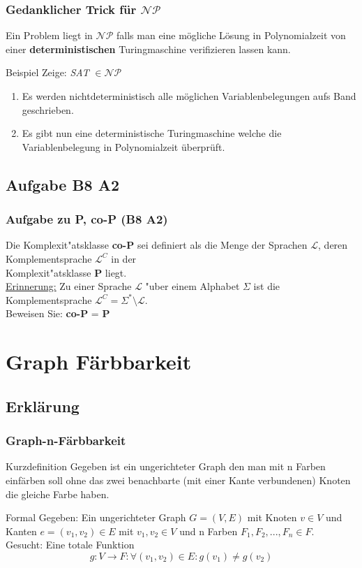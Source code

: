 \begin{frame}
	\frametitle{Gedanklicher Trick für $\mathcal{NP}$}
	Ein Problem liegt in $\mathcal{NP}$ falls man eine mögliche Lösung in Polynomialzeit von einer \textbf{deterministischen} Turingmaschine verifizieren lassen kann.
	\begin{block}{Beispiel}
		Zeige: \emph{SAT} $\in \mathcal{NP}$
		\begin{enumerate}
			\item Es werden nichtdeterministisch alle möglichen Variablenbelegungen aufs Band geschrieben.
			\item Es gibt nun eine deterministische Turingmaschine welche die Variablenbelegung in Polynomialzeit überprüft.
		\end{enumerate}
	\end{block}
\end{frame}
\subsection{Aufgabe B8 A2}
\begin{frame}
	\frametitle{Aufgabe zu P, co-P (B8 A2)}
	Die Komplexit"atsklasse \textbf{co-P} sei definiert als die Menge der Sprachen
	$\mathcal{L}$, deren Komplementsprache $\mathcal{L}^C$ in der\\
	Komplexit"atsklasse \textbf{P} liegt.\\
	\underline{Erinnerung:} Zu einer Sprache $\mathcal{L}$ "uber einem Alphabet $\Sigma$
	ist die Komplementsprache $\mathcal{L}^C = \Sigma^* \setminus \mathcal{L}$.\\[4pt]
	Beweisen Sie: \textbf{co-P} = \textbf{P}
\end{frame}

\section{Graph Färbbarkeit}
\subsection{Erklärung}
\begin{frame}
	\frametitle{Graph-n-Färbbarkeit}
	\begin{block}{Kurzdefinition}
	Gegeben ist ein ungerichteter Graph den man mit n Farben einfärben soll ohne das zwei benachbarte (mit einer Kante verbundenen) Knoten die gleiche Farbe haben.\\
	\end{block}
	\begin{block}{Formal}
	Gegeben: Ein ungerichteter Graph $G = (V,E)$ mit Knoten $v \in V$ und Kanten $e=(v_1, v_2)\in E$ mit $v_1, v_2 \in V$ und n Farben $F_1, F_2 , ... , F_n \in F$.\\
	Gesucht: Eine totale Funktion \[g: V \rightarrow F:\forall(v_1,v_2)\in E: g(v_1)\not=g(v_2)\]
	\end{block}
\end{frame}
